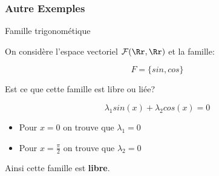 \documentclass[dvipsnames]{beamer}
\begin{document}
\begin{frame}[t]
  \frametitle{Autre Exemples}
  
  \begin{block}{Famille trigonométique}
    
    On considère l'espace vectoriel $\mathcal{F}(\Rr, \Rr)$ et la famille:

    $$
        F = \big\{ sin, cos\big\}
    $$
  \end{block}
  Est ce que cette famille est libre ou liée?
  \pause

  \begin{equation*}
    \lambda_1 sin(x) + \lambda_2 cos(x) = 0
  \end{equation*}

  \begin{itemize}
    \item Pour $x = 0$  on trouve que $\lambda_1 = 0$\\[4pt]
    \item Pour $x = \frac{\pi}{2}$  on trouve que $\lambda_2 = 0$\\[4pt]
  \end{itemize}
  \centering
  Ainsi cette famille est \textbf{\alert{libre}}.
\end{frame}
\end{document}
